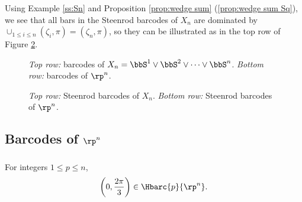 \subsubsection{} Using Example \ref{ss:Sn} and Proposition \ref{prop:wedge sum} (\ref{prop:wedge sum Sq}), we see that all bars in the Steenrod barcodes of $X_n$ are dominated by $\cup_{1\leq i\leq n}(\zeta_i,\pi)=(\zeta_n,\pi)$, so they can be illustrated as in the top row of Figure \ref{fig:sq barcodes}.

\begin{figure}
	\centering
	
	\caption{\emph{Top row:} barcodes of $X_n = \bbS^1\vee\bbS^2\vee\dots\vee\bbS^n$. \emph{Bottom row:} barcodes of $\rp^n$.}
	\label{fig:barcodes}
\end{figure}

\begin{figure}
	\centering
	
	\caption{\emph{Top row:} Steenrod barcodes of $X_n$. \emph{Bottom row:} Steenrod barcodes of $\rp^n$.}
	\label{fig:sq barcodes}
\end{figure}

\subsection{Barcodes of $\rp^n$}

\subsubsection{}\label{prop:RPn bar}
\lemma For integers $1 \leq p \leq n$,
\[
\left(0, \frac{2\pi}{3}\right) \in \Hbarc{p}{\rp^n}.
\]

